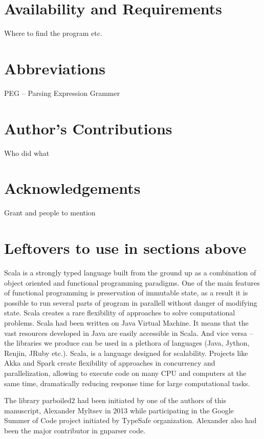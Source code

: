 \documentclass{bmcart}
\begin{document}
\section*{Availability and Requirements}

Where to find the program etc.

\section*{Abbreviations}

PEG -- Parsing Expression Grammer

\section*{Author's Contributions}

Who did what

\section*{Acknowledgements}

Grant and people to mention

\section*{Leftovers to use in sections above}
Scala is a strongly typed language built from the ground up as a combination of
object oriented and functional programming paradigms. One of the main features
of functional programming is preservation of immutable state, as a result it is
possible to run several parts of program in parallell without danger of
modifying state. Scala creates a rare flexibility of approaches to solve
computational problems. Scala had been written on Java Virtual Machine. It
means that the vast resources developed in Java are easily accessible in Scala.
And vice versa -- the libraries we produce can be used in a plethora of
languages (Java, Jython, Renjin, JRuby etc.). Scala, is a language designed for
scalability. Projects like Akka and Spark create flexibility of approaches in
concurrency and parallelization, allowing to execute code on many CPU and
computers at the same time, dramatically reducing response time for large
computational tasks.

The library parboiled2 had been initiated by one of the authors of this
manuscript, Alexander Myltsev in 2013 while participating in the Google Summer
of Code project initiated by TypeSafe organization. Alexander also had been the
major contributor in gnparser code.
\end{document}

